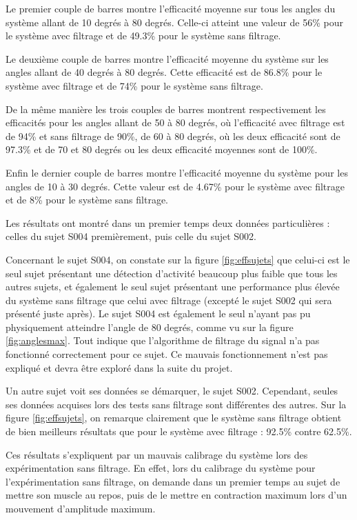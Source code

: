 \documentclass[letterpaper, twoside, 12pt, memoire, creativecommons, hyperref]{thETS}
\begin{document}
Le premier couple de barres montre l'efficacité moyenne sur tous les angles du système allant de 10 degrés à 80 degrés. Celle-ci atteint une valeur de 56\% pour le système avec filtrage et de 49.3\% pour le système sans filtrage. 

Le deuxième couple de barres montre l'efficacité moyenne du système sur les angles allant de 40 degrés à 80 degrés. Cette efficacité est de 86.8\% pour le système avec filtrage et de 74\% pour le système sans filtrage. 

De la même manière les trois couples de barres montrent respectivement les efficacités pour les angles allant de 50 à 80 degrés, où l'efficacité avec filtrage est de 94\% et sans filtrage de 90\%, de 60 à 80 degrés, où les deux efficacité sont de 97.3\% et de 70 et 80 degrés ou les deux efficacité moyennes sont de 100\%. 

Enfin le dernier couple de barres montre l'efficacité moyenne du système pour les angles de 10 à 30 degrés. Cette valeur est de 4.67\% pour le système avec filtrage et de 8\% pour le système sans filtrage.

Les résultats ont montré dans un premier temps deux données particulières : celles du sujet S004 premièrement, puis celle du sujet S002. 

Concernant le sujet S004, on constate sur la figure \ref{fig:effsujets} que celui-ci est le seul sujet présentant une détection d'activité beaucoup plus faible que tous les autres sujets, et également le seul sujet présentant une performance plus élevée du système sans filtrage que celui avec filtrage (excepté le sujet S002 qui sera présenté juste après). Le sujet S004 est également le seul n'ayant pas pu physiquement atteindre l'angle de 80 degrés, comme vu sur la figure \ref{fig:anglesmax}. Tout indique que l'algorithme de filtrage du signal n'a pas fonctionné correctement pour ce sujet. Ce mauvais fonctionnement n'est pas expliqué et devra être exploré dans la suite du projet.

Un autre sujet voit ses données se démarquer, le sujet S002. Cependant, seules ses données acquises lors des tests sans filtrage sont différentes des autres. Sur la figure \ref{fig:effsujets}, on remarque clairement que le système sans filtrage obtient de bien meilleurs résultats que pour le système avec filtrage : 92.5\% contre 62.5\%. 

Ces résultats s'expliquent par un mauvais calibrage du système lors des expérimentation sans filtrage. En effet, lors du calibrage du système pour l'expérimentation sans filtrage, on demande dans un premier temps au sujet de mettre son muscle au repos, puis de le mettre en contraction maximum lors d'un mouvement d'amplitude maximum. 
\end{document}
